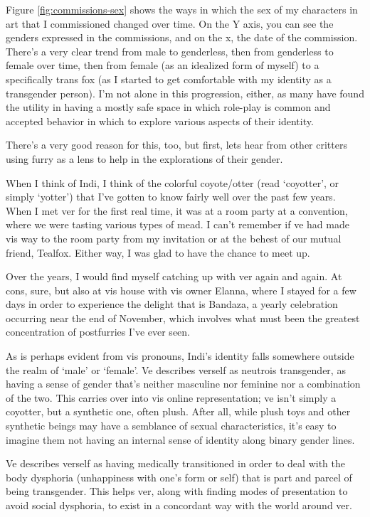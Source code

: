 Figure \ref{fig:commissions-sex} shows the ways in which the sex of my characters in art that I commissioned changed over time.  On the Y axis, you can see the genders expressed in the commissions, and on the x, the date of the commission.  There's a very clear trend from male to genderless, then from genderless to female over time, then from female (as an idealized form of myself) to a specifically trans fox (as I started to get comfortable with my identity as a transgender person).  I'm not alone in this progression, either, as many have found the utility in having a mostly safe space in which role-play is common and accepted behavior in which to explore various aspects of their identity.

There's a very good reason for this, too, but first, lets hear from other critters using furry as a lens to help in the explorations of their gender.

\secdiv

When I think of Indi, I think of the colorful coyote/otter (read `coyotter', or simply `yotter') that I've gotten to know fairly well over the past few years.  When I met ver for the first real time, it was at a room party at a convention, where we were tasting various types of mead.  I can't remember if ve had made vis way to the room party from my invitation or at the behest of our mutual friend, Tealfox.  Either way, I was glad to have the chance to meet up.

Over the years, I would find myself catching up with ver again and again.  At cons, sure, but also at vis house with vis owner Elanna, where I stayed for a few days in order to experience the delight that is Bandaza, a yearly celebration occurring near the end of November, which involves what must been the greatest concentration of postfurries I've ever seen.

As is perhaps evident from vis pronouns, Indi's identity falls somewhere outside the realm of `male' or `female'.  Ve describes verself as neutrois transgender, as having a sense of gender that's neither masculine nor feminine nor a combination of the two. This carries over into vis online representation; ve isn't simply a coyotter, but a synthetic one, often plush. After all, while plush toys and other synthetic beings may have a semblance of sexual characteristics, it's easy to imagine them not having an internal sense of identity along binary gender lines.

Ve describes verself as having medically transitioned in order to deal with the body dysphoria (unhappiness with one's form or self) that is part and parcel of being transgender.  This helps ver, along with finding modes of presentation to avoid social dysphoria, to exist in a concordant way with the world around ver.


